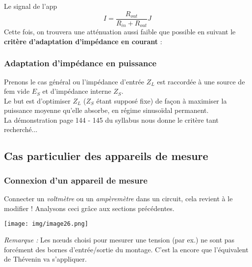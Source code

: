 Le signal de l'app
\begin{equation}
	I = \frac{R_{out}}{R_{in} + R_{out}}J
\end{equation}
Cette fois, on trouvera une atténuation aussi faible que possible en suivant le \textbf{critère d'adaptation d'impédance en courant} :\\


\subsubsection{Adaptation d'impédance en puissance}
Prenons le cas général ou l'impédance d'entrée $Z_L$ est raccordée à une source de fem vide \underline{$E_S$} et d'impédance interne $Z_S$.\\
Le but est d'optimiser $Z_L$ ($Z_S$ étant supposé fixe) de façon à maximiser la puissance moyenne qu'elle absorbe, en régime sinusoïdal permanent.\\
La démonstration page 144 - 145 du syllabus nous donne le critère tant recherché...\\



\subsection{Cas particulier des appareils de mesure}
\subsubsection{Connexion d'un appareil de mesure}
Connecter un \textit{voltmètre} ou un \textit{ampèremètre} dans un circuit, cela revient à le modifier ! Analysons ceci grâce aux sections précédentes.\\
\begin{center}
	\texttt{[image: img/image26.png]}
\end{center}
\textit{Remarque :} Les nœuds choisi pour mesurer une tension (par ex.) ne sont pas forcément des bornes d'entrée/sortie du montage. C'est la encore que l'équivalent de Thévenin va s'appliquer.

